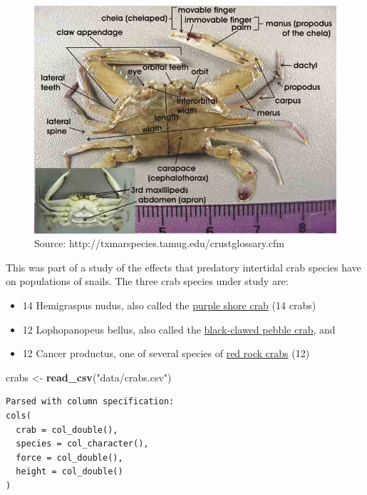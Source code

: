 \documentclass[
]{book}
\newenvironment{Shaded}{\begin{snugshade}}{\end{snugshade}}
\newcommand{\KeywordTok}[1]{\textcolor[rgb]{0.13,0.29,0.53}{\textbf{#1}}}
\newcommand{\NormalTok}[1]{#1}
\newcommand{\StringTok}[1]{\textcolor[rgb]{0.31,0.60,0.02}{#1}}
\providecommand{\tightlist}{%
  \setlength{\itemsep}{0pt}\setlength{\parskip}{0pt}}
\begin{document}
\begin{figure}
\includegraphics[width=0.7\linewidth]{figures/crabanat} \caption{Source: http://txmarspecies.tamug.edu/crustglossary.cfm}\label{fig:crab1-fig}
\end{figure}

This was part of a study of the effects that predatory intertidal crab species have on populations of snails. The three crab species under study are:

\begin{itemize}
\tightlist
\item
  14 Hemigraspus nudus, also called the \href{https://en.wikipedia.org/wiki/Purple_shore_crab}{purple shore crab} (14 crabs)
\item
  12 Lophopanopeus bellus, also called the \href{https://inverts.wallawalla.edu/Arthropoda/Crustacea/Malacostraca/Eumalacostraca/Eucarida/Decapoda/Brachyura/Family_Xanthidae/Lophopanopeus_bellus_bellus.html}{black-clawed pebble crab}, and
\item
  12 Cancer productus, one of several species of \href{https://en.wikipedia.org/wiki/Cancer_productus}{red rock crabs} (12)
\end{itemize}

\begin{Shaded}
\begin{Highlighting}[]
\NormalTok{crabs <-}\StringTok{ }\KeywordTok{read_csv}\NormalTok{(}\StringTok{"data/crabs.csv"}\NormalTok{) }
\end{Highlighting}
\end{Shaded}

\begin{verbatim}
Parsed with column specification:
cols(
  crab = col_double(),
  species = col_character(),
  force = col_double(),
  height = col_double()
)
\end{verbatim}
\end{document}
